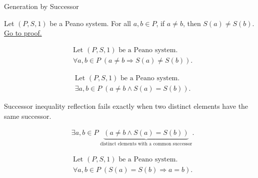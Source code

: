 \begin{topicbox}{Generation by Successor}
\begin{tcolorbox}[colback=thmbox, colframe=thmborder, arc=2pt,
  left=6pt, right=6pt, top=4pt, bottom=4pt,
  title={\small\textbf{Theorem (Successor Inequality Reflection)}} ,
  fonttitle=\small\bfseries]
\begin{theorem}
\label{thm:successor-inequality-reflection}
Let $(P,S,1)$ be a Peano system. For all $a,b \in P$, if $a \neq b$, then
$S(a)\neq S(b)$.
\hyperref[prf:successor-inequality-reflection]{Go to proof.}
\end{theorem}
\end{tcolorbox}

\begin{remark*}
\[
\begin{aligned}
&\text{Let } (P,S,1) \text{ be a Peano system.}\\
&\forall a,b \in P\;(a\neq b \Longrightarrow S(a)\neq S(b)).
\end{aligned}
\]
\end{remark*}

\begin{remark*}
\[
\begin{aligned}
&\text{Let } (P,S,1) \text{ be a Peano system.}\\
&\exists a,b \in P\;(a\neq b \land S(a)=S(b)).
\end{aligned}
\]
\end{remark*}

\begin{remark*}
Successor inequality reflection fails exactly when two distinct elements have
the same successor.
\end{remark*}

\begin{remark*}
\[
\begin{aligned}
&\exists a,b \in P\;
\underbrace{(a\neq b \land S(a)=S(b))}_{\text{distinct elements with a common successor}}.
\end{aligned}
\]
\end{remark*}

\begin{remark*}
\[
\begin{aligned}
&\text{Let } (P,S,1) \text{ be a Peano system.}\\
&\forall a,b \in P\;(S(a)=S(b) \Longrightarrow a=b).
\end{aligned}
\]
\end{remark*}


\end{topicbox}
